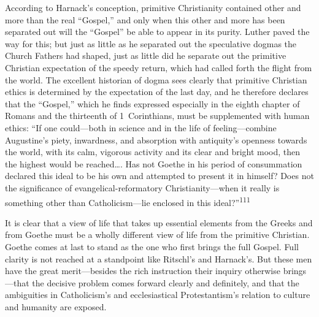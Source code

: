 \documentclass[12pt,a4paper]{book}
\begin{document}
According to Harnack's conception, primitive Christianity contained other and more than the real ``Gospel,'' and only
when this other and more has been separated out will the ``Gospel'' be able to appear in its purity. Luther paved the
way for this; but just as little as he separated out the speculative dogmas the Church Fathers had shaped, just as
little did he separate out the primitive Christian expectation of the speedy return, which had called forth the flight
from the world. The excellent historian of dogma sees clearly that primitive Christian ethics is determined by the
expectation of the last day, and he therefore declares that the ``Gospel,'' which he finds expressed especially in the
eighth chapter of Romans and the thirteenth of 1~Corinthians, must be supplemented with human ethics: ``If one
could---both in science and in the life of feeling---combine Augustine's piety, inwardness, and absorption with
antiquity's openness towards the world, with its calm, vigorous activity and its clear and bright mood, then the
highest would be reached\ldots. Has not Goethe in his period of consummation declared this ideal to be his own and
attempted to present it in himself? Does not the significance of evangelical-reformatory Christianity---when it really
is something other than Catholicism---lie enclosed in this ideal?''\textsuperscript{111}

It is clear that a view of life that takes up essential elements from the Greeks and from Goethe must be a wholly
different view of life from the primitive Christian. Goethe comes at last to stand as the one who first brings the full
Gospel. Full clarity is not reached at a standpoint like Ritschl's and Harnack's. But these men have the great
merit---besides the rich instruction their inquiry otherwise brings---that the decisive problem comes forward clearly
and definitely, and that the ambiguities in Catholicism's and ecclesiastical Protestantism's relation to culture and
humanity are exposed.

\medskip
\end{document}
